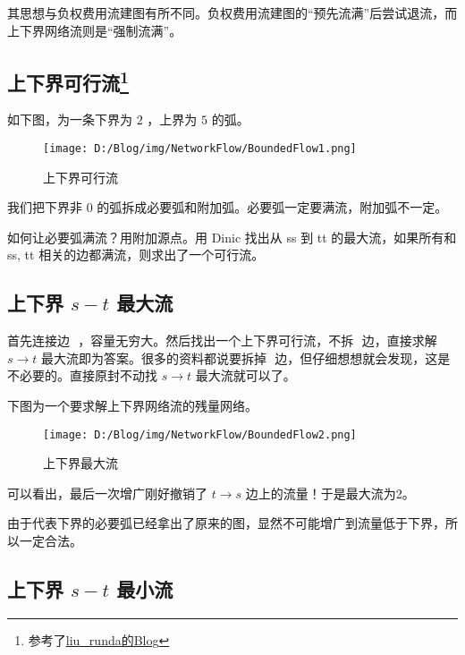 \documentclass[]{ctexart}
\begin{document}
其思想与负权费用流建图有所不同。负权费用流建图的``预先流满''后尝试退流，而上下界网络流则是``强制流满''。

\hypertarget{header-n616}{%
\subsection[上下界可行流]{\texorpdfstring{上下界可行流\footnote{参考了\href{http://www.cnblogs.com/liu-runda/p/6262832.html}{liu\_runda的Blog}}}{上下界可行流}}\label{header-n616}}

如下图，为一条下界为 \(2\) ，上界为 \(5\) 的弧。

\begin{figure}
\centering
\texttt{[image: D:/Blog/img/NetworkFlow/BoundedFlow1.png]} 
\caption{上下界可行流}
\end{figure}

我们把下界非 0 的弧拆成必要弧和附加弧。必要弧一定要满流，附加弧不一定。

 如何让必要弧满流？用附加源点。用 Dinic 找出从 ss 到 tt
的最大流，如果所有和 ss, tt 相关的边都满流，则求出了一个可行流。

\hypertarget{header-n623}{%
\subsection{\texorpdfstring{上下界 \(s-t\)
最大流}{上下界 s-t 最大流}}\label{header-n623}}

 首先连接边 \(<t, s>\) ，容量无穷大。然后找出一个上下界可行流，不拆
\(<t, s>\) 边，直接求解 \(s \rightarrow t\)
最大流即为答案。很多的资料都说要拆掉 \(<t, s>\)
边，但仔细想想就会发现，这是不必要的。直接原封不动找 \(s \rightarrow t\)
最大流就可以了。

 下图为一个要求解上下界网络流的残量网络。

\begin{figure}
\centering
\texttt{[image: D:/Blog/img/NetworkFlow/BoundedFlow2.png]}
\caption{上下界最大流}
\end{figure}

可以看出，最后一次增广刚好撤销了 \(t \rightarrow s\)
边上的流量！于是最大流为2。


由于代表下界的必要弧已经拿出了原来的图，显然不可能增广到流量低于下界，所以一定合法。

\hypertarget{header-n633}{%
\subsection{\texorpdfstring{上下界 \(s - t\)
最小流}{上下界 s - t 最小流}}\label{header-n633}}
\end{document}

